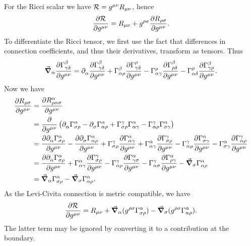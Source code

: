 For the Ricci scalar we have $\mathcal{R} = g^{\mu\nu}R_{\mu\nu}$, hence
\begin{align*}
	\pdv{\ensuremath{\mathcal{R}}}{g^{\mu\nu}} = R_{\mu\nu} + g^{\rho\sigma}\pdv{R_{\rho\sigma}}{g^{\mu\nu}}.
\end{align*}
To differentiate the Ricci tensor, we first use the fact that differences in connection coefficients, and thus their derivatives, transform as tensors. Thus
\begin{align*}
	\dcov{\alpha}{\pdv{\chris{\beta}{\gamma}{\delta}}{g^{\mu\nu}}} = \del{\alpha}{\pdv{\chris{\beta}{\gamma}{\delta}}{g^{\mu\nu}}} + \chris{\beta}{\alpha}{\rho}\pdv{\chris{\rho}{\gamma}{\delta}}{g^{\mu\nu}} - \chris{\rho}{\alpha}{\gamma}\pdv{\chris{\beta}{\rho}{\delta}}{g^{\mu\nu}} - \chris{\rho}{\alpha}{\delta}\pdv{\chris{\beta}{\gamma}{\rho}}{g^{\mu\nu}}.
\end{align*}
Now we have
\begin{align*}
	\pdv{R_{\rho\sigma}}{g^{\mu\nu}} &= \pdv{R^{\alpha}_{\rho\alpha\sigma}}{g^{\mu\nu}} \\
	                                 &= \pdv{g^{\mu\nu}}\left(\del{\alpha}{\chris{\alpha}{\sigma}{\rho}} - \del{\sigma}{\chris{\alpha}{\alpha}{\rho}} + \chris{\gamma}{\sigma}{\rho}\chris{\alpha}{\alpha}{\gamma} - \chris{\gamma}{\alpha}{\rho}\chris{\alpha}{\sigma}{\gamma}\right) \\
	                                 &= \pdv{\del{\alpha}{\chris{\alpha}{\sigma}{\rho}}}{g^{\mu\nu}} - \pdv{\del{\sigma}{\chris{\alpha}{\alpha}{\rho}}}{g^{\mu\nu}} + \chris{\gamma}{\sigma}{\rho}\pdv{\chris{\alpha}{\alpha}{\gamma}}{g^{\mu\nu}} + \chris{\alpha}{\alpha}{\gamma}\pdv{\chris{\gamma}{\sigma}{\rho}}{g^{\mu\nu}} - \chris{\gamma}{\alpha}{\rho}\pdv{\chris{\alpha}{\sigma}{\gamma}}{g^{\mu\nu}} - \chris{\alpha}{\sigma}{\gamma}\pdv{\chris{\gamma}{\alpha}{\rho}}{g^{\mu\nu}} \\
	                                 &= \pdv{\del{\alpha}{\chris{\alpha}{\sigma}{\rho}}}{g^{\mu\nu}} + \chris{\alpha}{\alpha}{\gamma}\pdv{\chris{\gamma}{\sigma}{\rho}}{g^{\mu\nu}} - \chris{\gamma}{\alpha}{\rho}\pdv{\chris{\alpha}{\gamma}{\sigma}}{g^{\mu\nu}} - \chris{\gamma}{\alpha}{\sigma}\pdv{\chris{\alpha}{\rho}{\gamma}}{g^{\mu\nu}} - \dcov{\sigma}{\chris{\alpha}{\alpha}{\rho}} \\
	                                 &= \dcov{\alpha}{\chris{\alpha}{\sigma}{\rho}} - \dcov{\sigma}{\chris{\alpha}{\alpha}{\rho}}.
\end{align*}
As the Levi-Civita connection is metric compatible, we have
\begin{align*}
	\pdv{\R}{g^{\mu\nu}} = R_{\mu\nu} + \dcov{\alpha}{(g^{\rho\sigma}\chris{\alpha}{\sigma}{\rho})} - \dcov{\sigma}{(g^{\rho\sigma}\chris{\alpha}{\alpha}{\rho})}.
\end{align*}
The latter term may be ignored by converting it to a contribution at the boundary.


